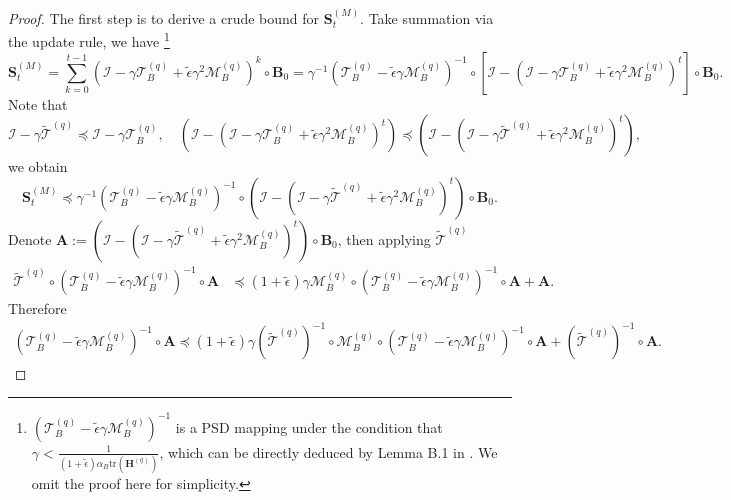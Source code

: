 \documentclass[11pt, letterpaper]{article}
\begin{document}
\begin{proof}
    The first step is to derive a crude bound for $\mathbf{S}_t^{(M)}$. Take summation via the update rule, we have \footnote{$({\mathcal{T}_B^{(q)}}-\tilde{\epsilon}\gamma \mathcal{M}_B^{(q)})^{-1}$ is a PSD mapping under the condition that $\gamma < \frac{1}{(1+\tilde{\epsilon})\alpha_B\mathrm{tr}(\mathbf{H}^{(q)})}$, which can be directly deduced by Lemma B.1 in \citet{zou2023benign}. We omit the proof here for simplicity.}
    \begin{equation*}
        \mathbf{S}_t^{(M)}=\sum_{k=0}^{t-1}(\mathcal{I}-\gamma\mathcal{T}_B^{(q)}+\tilde{\epsilon}\gamma^2\mathcal{M}_B^{(q)})^k\circ\mathbf{B}_0=\gamma^{-1}({\mathcal{T}^{(q)}_B}-\tilde{\epsilon}\gamma\mathcal{M}_B^{(q)})^{-1}\circ\left[\mathcal{I}-(\mathcal{I}-\gamma\mathcal{T}_B^{(q)}+\tilde{\epsilon}\gamma^2\mathcal{M}_B^{(q)})^t\right]\circ\mathbf{B}_0.
    \end{equation*}
    Note that
    \begin{equation*}
        \mathcal{I}-\gamma\widetilde{\mathcal{T}}^{(q)} \preceq \mathcal{I}-\gamma\mathcal{T}_B^{(q)}, \quad (\mathcal{I}-(\mathcal{I}-\gamma\mathcal{T}_B^{(q)}+\tilde{\epsilon}\gamma^2\mathcal{M}_B^{(q)})^t) \preceq (\mathcal{I}-(\mathcal{I}-\gamma\widetilde{\mathcal{T}}^{(q)}+\tilde{\epsilon}\gamma^2\mathcal{M}_B^{(q)})^t),
    \end{equation*}
    we obtain
    \begin{equation*}
        \mathbf{S}_t^{(M)}\preceq\gamma^{-1}({\mathcal{T}_B^{(q)}}-\tilde{\epsilon}\gamma \mathcal{M}_B^{(q)})^{-1}\circ(\mathcal{I}-(\mathcal{I}-\gamma\widetilde{\mathcal{T}}^{(q)}+\tilde{\epsilon}\gamma^2\mathcal{M}_B^{(q)})^t)\circ\mathbf{B}_0.
    \end{equation*}
    Denote $\mathbf{A}:=(\mathcal{I}-(\mathcal{I}-\gamma\widetilde{\mathcal{T}}^{(q)}+\tilde{\epsilon}\gamma^2\mathcal{M}_B^{(q)})^t)\circ\mathbf{B}_0$, then applying $\widetilde{\mathcal{T}}^{(q)}$
    \begin{equation*}
        \begin{aligned}
            \widetilde{\mathcal{T}}^{(q)}\circ({\mathcal{T}_B^{(q)}}-\tilde{\epsilon}\gamma \mathcal{M}_B^{(q)})^{-1}\circ\mathbf{A}&\preceq(1+\tilde{\epsilon})\gamma\mathcal{M}_B^{(q)}\circ({\mathcal{T}_B^{(q)}}-\tilde{\epsilon}\gamma \mathcal{M}_B^{(q)})^{-1}\circ\mathbf{A}+\mathbf{A}.
        \end{aligned}
    \end{equation*}
    Therefore
    \begin{equation*}
        \begin{aligned}
            ({\mathcal{T}_B^{(q)}}-\tilde{\epsilon}\gamma \mathcal{M}_B^{(q)})^{-1}\circ\mathbf{A} \preceq (1+\tilde{\epsilon})\gamma{(\widetilde{\mathcal{T}}^{(q)})}^{-1}\circ\mathcal{M}_B^{(q)}\circ({\mathcal{T}_B^{(q)}}-\tilde{\epsilon}\gamma \mathcal{M}_B^{(q)})^{-1}\circ\mathbf{A}+(\widetilde{\mathcal{T}}^{(q)})^{-1}\circ\mathbf{A}.
        \end{aligned}
    \end{equation*}


\end{proof}
\end{document}

